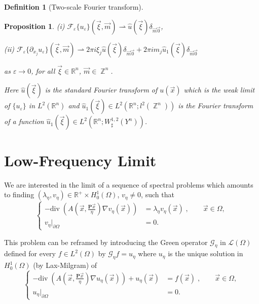 \documentclass[a4paper,reqno]{amsart}
\numberwithin{equation}{section}
\numberwithin{equation}{section}		%
\numberwithin{figure}{section}			%
\numberwithin{table}{section}				%
\newcommand{\R}{\mathbb{R}}
\newcommand{\ntodo}[1]{\todo[inline, backgroundcolor=blue!20!white, bordercolor=blue]{Niklas: #1}}
\newtheorem{proposition}[theorem]{Proposition}
\theoremstyle{definition}
\newtheorem{definition}[theorem]{Definition}
\DeclareMathOperator{\Z}{\mathbb{Z}}
\renewcommand{\hat}{\widehat}
\newcommand{\<}{\ensuremath \leq}
\renewcommand{\>}{\ensuremath \geq}
\renewcommand{\hat}{\widehat}
\def\e{\eta}
\begin{document}
\begin{definition}[Two-scale Fourier transform]
\begin{proposition}
    (i) $\mathcal{F}_\varepsilon\{u_\varepsilon\}(\vec{\xi},\vec{m})\rightharpoonup \hat{u}(\vec{\xi})\delta_{\vec{m}\vec{0}}$,

    (ii) $\mathcal{F}_\varepsilon\{\partial_{x_j}u_\varepsilon\}(\vec{\xi},\vec{m})\rightharpoonup 2\pi i\xi_j\hat{u}(\vec{\xi})\delta_{\vec{m}\vec{0}}+2\pi i m_j \hat{u}_1(\vec{\xi})\delta_{\vec{m}\vec{0}}$

    as $\varepsilon\to 0$, for all $\vec{\xi}\in\R^n$, $\vec{m}\in\Z^n$.
    
    Here $\hat{u}(\vec{\xi})$ is the standard Fourier transform of $u(\vec{x})$ which is the weak limit of $\{u_\varepsilon\}$ in $L^2(\R^n)$ and $\hat{u}_1(\vec{\xi})\in L^2(\R^n;l^2(\Z^n))$ is the Fourier transform of a function $\hat{u}_1(\vec{\xi})\in L^2(\R^n;W^{1,2}_\sharp(Y^n))$.
\end{proposition}

\end{definition}

\fi
%
\section{Low-Frequency Limit
}


We are interested in the limit of a sequence of spectral problems which amounts to finding $(\lambda_\eta,v_\eta)\in \R^+ \times H^1_0(\Omega)$, $v_\eta\neq 0$, such that
 \begin{equation}  \label{eq:NL_eta}
     \left\{
        \begin{aligned}
          -  \mathrm{div} \; \left( A\left( \vec{x}, \frac{\textbf{P}\vec{x}}{\e} \right) \nabla v_\eta(\vec{x}) \right ) & = {\lambda_\eta} v_\eta(\vec{x}) \;, \qquad \vec{x} \in \Omega,\\
            v_\e|_{\partial\Omega} & = 0.
        \end{aligned}
    \right.
 \end{equation}


This problem can be reframed by introducing the Green operator ${\mathcal G}_\eta$ in ${\mathcal L}(\Omega)$ defined for every $f\in L^2(\Omega)$ by ${\mathcal G}_\eta f=u_\eta$ where $u_\eta$ is the unique solution in  $H^1_0(\Omega)$ (by Lax-Milgram) of
\begin{equation}  \label{eq:GREEN_eta}
     \left\{
        \begin{aligned}
          -  \mathrm{div} \; \left( A\left( \vec{x}, \frac{\textbf{P}\vec{x}}{\e} \right) \nabla u_\eta(\vec{x}) \right )  + u_\eta(\vec{x})
          & = f(\vec{x}) \;, \qquad \vec{x} \in \Omega,\\
            u_\e|_{\partial\Omega} & = 0.
        \end{aligned}
    \right.
 \end{equation}
\end{document}
